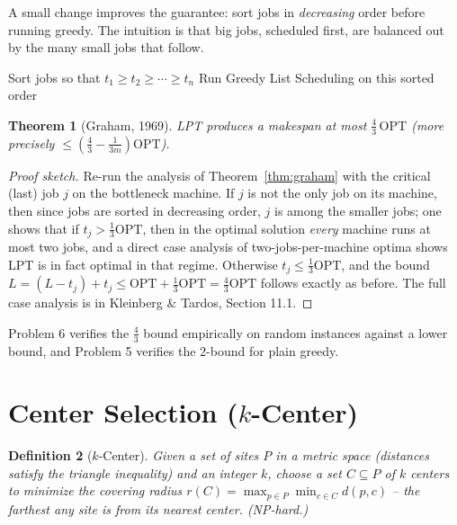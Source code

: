 \documentclass[11pt]{article}
\newtheorem{theorem}{Theorem}[section]
\newtheorem{definition}[theorem]{Definition}
\begin{document}
A small change improves the guarantee: sort jobs in \emph{decreasing} order before running
greedy. The intuition is that big jobs, scheduled first, are balanced out by the many small
jobs that follow.

\begin{algorithm}[h]
\caption{Longest-Processing-Time First, LPT (Problem 6)}
\begin{algorithmic}[1]
\State Sort jobs so that $t_1 \ge t_2 \ge \cdots \ge t_n$
\State Run Greedy List Scheduling on this sorted order
\end{algorithmic}
\end{algorithm}

\begin{theorem}[Graham, 1969]
\label{thm:lpt}
LPT produces a makespan at most $\frac{4}{3}\,\mathrm{OPT}$ (more precisely $\le
(\tfrac{4}{3} - \tfrac{1}{3m})\mathrm{OPT}$).
\end{theorem}

\begin{proof}[Proof sketch]
Re-run the analysis of Theorem~\ref{thm:graham} with the critical (last) job $j$ on the
bottleneck machine. If $j$ is not the only job on its machine, then since jobs are sorted
in decreasing order, $j$ is among the smaller jobs; one shows that if $t_j > \frac{1}{3}
\mathrm{OPT}$, then in the optimal solution \emph{every} machine runs at most two jobs,
and a direct case analysis of two-jobs-per-machine optima shows LPT is in fact optimal in
that regime. Otherwise $t_j \le \frac{1}{3}\mathrm{OPT}$, and the bound $L = (L - t_j) +
t_j \le \mathrm{OPT} + \frac{1}{3}\mathrm{OPT} = \frac{4}{3}\mathrm{OPT}$ follows exactly
as before. The full case analysis is in Kleinberg \& Tardos, Section 11.1.
\end{proof}

Problem 6 verifies the $\tfrac{4}{3}$ bound empirically on random instances against a
lower bound, and Problem 5 verifies the $2$-bound for plain greedy.

\section{Center Selection ($k$-Center)}

\begin{definition}[$k$-Center]
Given a set of sites $P$ in a metric space (distances satisfy the triangle inequality) and
an integer $k$, choose a set $C \subseteq P$ of $k$ \emph{centers} to minimize the
\emph{covering radius} $r(C) = \max_{p \in P} \min_{c \in C} d(p, c)$ -- the farthest any
site is from its nearest center. (NP-hard.)
\end{definition}
\end{document}
